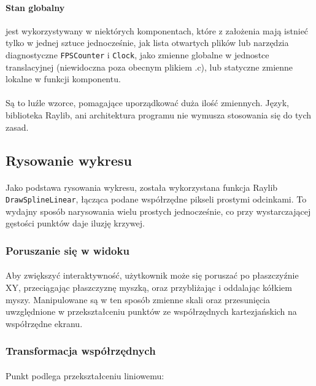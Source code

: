 \documentclass[12pt]{report}
\begin{document}
	\paragraph{Stan globalny} jest wykorzystywany w niektórych komponentach, które z założenia mają istnieć tylko w jednej sztuce jednocześnie, jak lista otwartych plików lub narzędzia diagnostyczne \verb|FPSCounter| i \verb|Clock|, jako zmienne globalne w jednostce translacyjnej (niewidoczna poza obecnym plikiem .c), lub statyczne zmienne lokalne w funkcji komponentu.
	\paragraph{}
	Są to luźle wzorce, pomagające uporządkować duża ilość zmiennych. Język, biblioteka Raylib, ani architektura programu nie wymusza stosowania się do tych zasad.
	
	
	\pagebreak
	\subsection{Rysowanie wykresu}
	\paragraph{}
	Jako podstawa rysowania wykresu, została wykorzystana funkcja Raylib \verb|DrawSplineLinear|, łącząca podane współrzędne pikseli prostymi odcinkami. To wydajny sposób narysowania wielu prostych jednocześnie, co przy wystarczającej gęstości punktów daje iluzję krzywej.

	
	\subsubsection{Poruszanie się w widoku}
	\paragraph{}
	Aby zwiększyć interaktywność, użytkownik może się poruszać po płaszczyźnie XY, przeciągając płaszczyznę myszką, oraz przybliżając i oddalając kółkiem myszy. Manipulowane są w ten sposób zmienne skali oraz przesunięcia uwzględnione w przekształceniu punktów ze współrzędnych kartezjańskich na współrzędne ekranu.
	
	\subsubsection{Transformacja współrzędnych}
	
	\paragraph{}
	Punkt podlega przekształceniu liniowemu:
	
\end{document}

